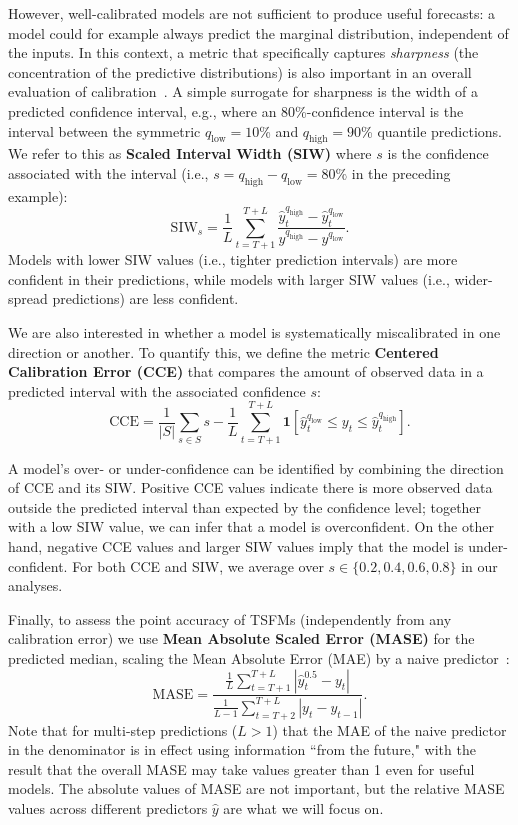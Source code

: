 \documentclass{article}
\begin{document}
However, well-calibrated models are not sufficient to produce useful forecasts: a model could for example always predict the marginal distribution, independent of  the inputs. 
In this context, a metric that specifically captures {\it  sharpness} (the concentration of the predictive distributions) is also important in an overall evaluation of calibration~\citep{probforcasttext,calibratedregression}.
A simple surrogate for sharpness is the width of a predicted confidence interval, e.g., where an 80\%-confidence interval is the interval between the symmetric $q_{\text{low}}= 10$\% and $q_{\text{high}}= 90$\% quantile predictions.
We refer to this as \textbf{Scaled Interval Width (SIW)} where $s$ is the confidence associated with the interval (i.e., $s = q_{\text{high}} - q_{\text{low}} = 80\%$ in the preceding example):
\begin{equation}
    \mbox{SIW}_s = \frac{1}{L}\sum_{t=T+1}^{T+L} \frac{\hat{y}^{q_{\text{high}}}_t - \hat{y}^{q_{\text{low}}}_t}{y^{q_{\text{high}}}-y^{q_{\text{low}}}}.
\end{equation}
Models with lower SIW values (i.e., tighter prediction intervals) are more confident in their predictions, while models with larger SIW values (i.e., wider-spread predictions) are less confident.

We are also interested in whether a model is systematically miscalibrated in one direction or another. 
To quantify this, we define the metric \textbf{Centered Calibration Error (CCE)} that compares the amount of observed data in a predicted interval with the associated confidence $s$:
\begin{equation}
    \mbox{CCE} = \frac{1}{|S|}\sum_{s\in S} s-\frac{1}{L}\sum_{t=T+1}^{T+L}\mathbf{1}\left[\hat{y}_t^{q_{\text{low}}} \leq y_t \leq \hat{y}_t^{q_{\text{high}}}\right].
\end{equation}

A model's over- or under-confidence can be identified by combining the direction of CCE and its SIW.
Positive CCE values indicate there is more observed data outside the predicted interval than expected by the confidence level; together with a low SIW value, we can infer that a model is overconfident. 
On the other hand, negative CCE values and larger SIW values imply that the model is under-confident. 
For both CCE and SIW, we average over $s \in \{0.2, 0.4, 0.6, 0.8\}$ in our analyses.

Finally, to assess the point accuracy of TSFMs (independently from any calibration error) we use \textbf{Mean Absolute Scaled Error (MASE)} for the predicted median, scaling the Mean Absolute Error (MAE) by a naive predictor~\citep{forecasttextbook}: 
\begin{equation} 
     \mbox{MASE}  = \frac{\frac{1}{L}\sum^{T+L}_{t=T+1}|\hat{y}^{0.5}_t - y_t|}{\frac{1}{L-1}\sum^{T+L}_{t=T+2}|y_t - y_{t-1}| }.
\end{equation}
Note that for multi-step predictions ($L>1$) that the MAE of the naive predictor in the denominator is in effect using information ``from the future," with the result that the overall MASE may take values greater than 1 even for useful models. 
The absolute values of MASE are not important, but the relative MASE values across different predictors $\hat{y}$ are what we will focus on.
\end{document}
